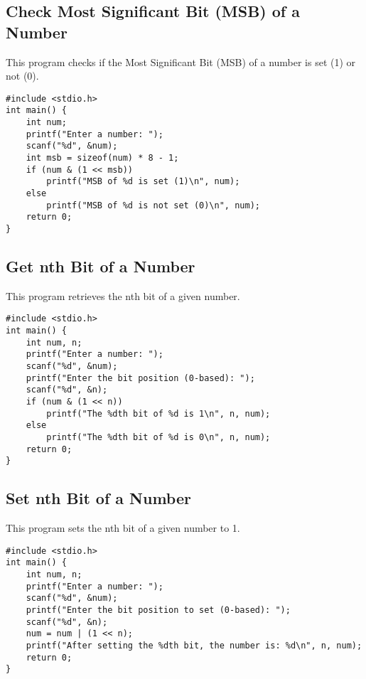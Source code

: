\documentclass[a4paper,12pt]{article}
\begin{document}
\newpage

\subsection{Check Most Significant Bit (MSB) of a Number}
This program checks if the Most Significant Bit (MSB) of a number is set (1) or not (0).

\begin{lstlisting}[caption={Check Most Significant Bit (MSB) of a Number}]
#include <stdio.h>
int main() {
    int num;
    printf("Enter a number: ");
    scanf("%d", &num);
    int msb = sizeof(num) * 8 - 1;
    if (num & (1 << msb))
        printf("MSB of %d is set (1)\n", num);
    else
        printf("MSB of %d is not set (0)\n", num);
    return 0;
}
\end{lstlisting}

\newpage

\subsection{Get nth Bit of a Number}
This program retrieves the nth bit of a given number.

\begin{lstlisting}[caption={Get nth Bit of a Number}]
#include <stdio.h>
int main() {
    int num, n;
    printf("Enter a number: ");
    scanf("%d", &num);
    printf("Enter the bit position (0-based): ");
    scanf("%d", &n);
    if (num & (1 << n))
        printf("The %dth bit of %d is 1\n", n, num);
    else
        printf("The %dth bit of %d is 0\n", n, num);
    return 0;
}
\end{lstlisting}

\newpage

\subsection{Set nth Bit of a Number}
This program sets the nth bit of a given number to 1.

\begin{lstlisting}[caption={Set nth Bit of a Number}]
#include <stdio.h>
int main() {
    int num, n;
    printf("Enter a number: ");
    scanf("%d", &num);
    printf("Enter the bit position to set (0-based): ");
    scanf("%d", &n);
    num = num | (1 << n);
    printf("After setting the %dth bit, the number is: %d\n", n, num);
    return 0;
}
\end{lstlisting}
\end{document}

